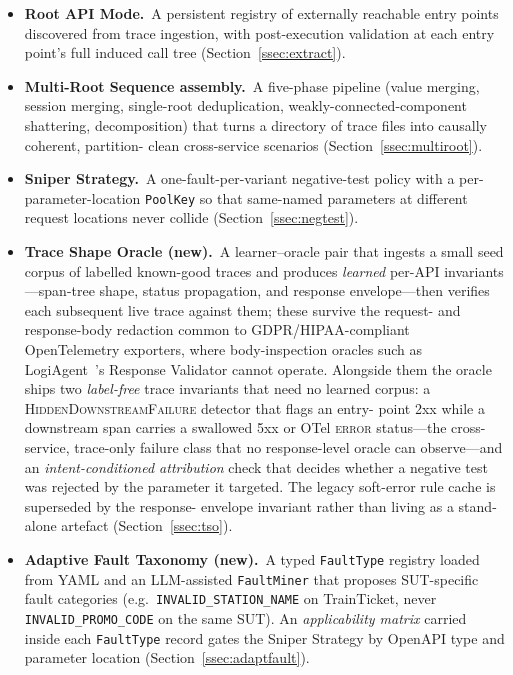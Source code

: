 \documentclass[conference]{IEEEtran}
\begin{document}
\begin{itemize}[leftmargin=*]
  \item \textbf{Root API Mode.}~A persistent registry of externally
        reachable entry points discovered from trace ingestion, with
        post-execution validation at each entry point's full induced
        call tree (Section~\ref{ssec:extract}).
  \item \textbf{Multi-Root Sequence assembly.}~A five-phase pipeline
        (value merging, session merging, single-root deduplication,
        weakly-connected-component shattering, decomposition) that turns
        a directory of trace files into causally coherent, partition-
        clean cross-service scenarios (Section~\ref{ssec:multiroot}).
  \item \textbf{Sniper Strategy.}~A one-fault-per-variant negative-test
        policy with a per-parameter-location \texttt{PoolKey} so that
        same-named parameters at different request locations never
        collide (Section~\ref{ssec:negtest}).
  \item \textbf{Trace Shape Oracle (new).}~A learner--oracle pair that
        ingests a small seed corpus of labelled known-good traces and
        produces \emph{learned} per-API invariants---span-tree shape,
        status propagation, and response envelope---then verifies each
        subsequent live trace against them; these survive the request-
        and response-body redaction common to GDPR/HIPAA-compliant
        OpenTelemetry exporters, where body-inspection oracles such as
        LogiAgent~\cite{zhang2025logiagent}'s Response Validator cannot
        operate.  Alongside them the oracle ships two \emph{label-free}
        trace invariants that need no learned corpus: a
        \textsc{HiddenDownstreamFailure} detector that flags an entry-
        point 2xx while a downstream span carries a swallowed 5xx or
        OTel \textsc{error} status---the cross-service, trace-only
        failure class that no response-level oracle can observe---and an
        \emph{intent-conditioned attribution} check that decides whether
        a negative test was rejected by the parameter it targeted. The
        legacy soft-error rule cache is superseded by the response-
        envelope invariant rather than living as a stand-alone artefact
        (Section~\ref{ssec:tso}).
  \item \textbf{Adaptive Fault Taxonomy (new).}~A typed
        \texttt{FaultType} registry loaded from YAML and an LLM-assisted
        \texttt{FaultMiner} that proposes SUT-specific fault categories
        (e.g.\ \texttt{INVALID\_STATION\_NAME} on TrainTicket, never
        \texttt{INVALID\_PROMO\_CODE} on the same SUT).  An
        \emph{applicability matrix} carried inside each \texttt{FaultType}
        record gates the Sniper Strategy by OpenAPI type and parameter
        location (Section~\ref{ssec:adaptfault}).
\end{itemize}
\end{document}
